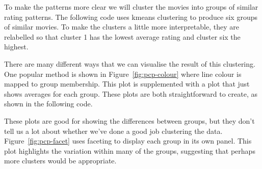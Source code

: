 {To make the patterns more clear we will cluster the movies into groups of similar rating patterns. The following code uses kmeans clustering \citep{hartigan:1979} to produce six groups of similar movies.  To make the clusters a little more interpretable, they are relabelled so that cluster 1 has the lowest average rating and cluster six the highest. 

% 


There are many different ways that we can visualise the result of this clustering. One popular method is shown in Figure~\ref{fig:pcp-colour} where line colour is mapped to group membership. This plot is supplemented with a plot that just shows averages for each group. These plots are both straightforward to create, as shown in the following code.

% 


These plots are good for showing the differences between groups, but they don't tell us a lot about whether we've done a good job clustering the data.  Figure~\ref{fig:pcp-facet} uses faceting to display each group in its own panel. This plot highlights the variation within many of the groups, suggesting that perhaps more clusters would be appropriate.

% 



}

